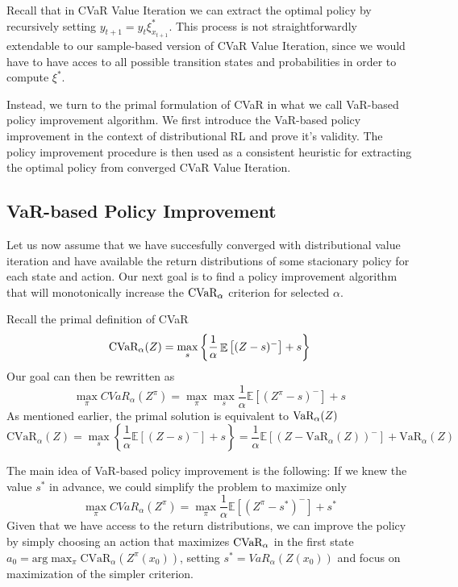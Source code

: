 Recall that in CVaR Value Iteration we can extract the optimal policy by recursively setting $y_{t+1}=y_t \xi^*_{x_{t+1}}$. This process is not straightforwardly extendable to our sample-based version of CVaR Value Iteration, since we would have to have acces to all possible transition states and probabilities in order to compute $\xi^*$.

Instead, we turn to the primal formulation of CVaR in what we call VaR-based policy improvement algorithm. We first introduce the VaR-based policy improvement in the context of distributional RL and prove it's validity. The policy improvement procedure is then used as a consistent heuristic for extracting the optimal policy from converged CVaR Value Iteration.


\subsection{VaR-based Policy Improvement}

Let us now assume that we have succesfully converged with distributional value iteration and have available the return distributions of some stacionary policy for each state and action. Our next goal is to find a policy improvement algorithm that will monotonically increase the $\text{CVaR}_\alpha$ criterion for selected $\alpha$.

Recall the primal definition of CVaR 
\begin{equation*}
\text{CVaR}_\alpha(Z)=
\max_s\left\lbrace \dfrac{1}{\alpha}\mathop{\mathbb{E}}
\left[ (Z-s)^-\right] + s  \right\rbrace 
\end{equation*}
Our goal  can then be rewritten as
\begin{equation*}
\max_\pi CVaR_\alpha(Z^\pi) = \max_\pi \max_s \dfrac{1}{\alpha}\mathbb{E}
\left[ (Z^\pi-s)^-\right] + s
\end{equation*}
As mentioned earlier, the primal solution is equivalent to $\text{VaR}_\alpha(Z)$
\begin{equation*}
\text{CVaR}_\alpha(Z)=
\max_s\left\lbrace \dfrac{1}{\alpha}\mathbb{E}
\left[ (Z-s)^-\right] + s  \right\rbrace =\dfrac{1}{\alpha}\mathbb{E}
\left[ (Z - \text{VaR}_\alpha(Z))^-\right] + \text{VaR}_\alpha(Z) 
\end{equation*}

The main idea of VaR-based policy improvement is the following: If we knew the value $s^*$ in advance, we could simplify the problem to maximize only
\begin{equation}\label{eqn:varbasedgoal}
\max_\pi CVaR_\alpha(Z^\pi) = \max_\pi \dfrac{1}{\alpha}\mathbb{E}
\left[ (Z^\pi-s^*)^-\right] + s^*
\end{equation}
Given that we have access to the return distributions, we can improve the policy by simply choosing an action that maximizes $\text{CVaR}_\alpha$ in the first state $a_0 = \text{arg}\max_\pi\text{CVaR}_\alpha(Z^\pi(x_0))$, setting $s^* = VaR_\alpha(Z(x_0))$ and focus on maximization of the simpler criterion.

